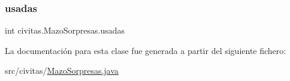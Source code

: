 \subsubsection{\texorpdfstring{usadas}{usadas}}
{\footnotesize\ttfamily int civitas.\+Mazo\+Sorpresas.\+usadas\hspace{0.3cm}{\ttfamily [private]}}



La documentación para esta clase fue generada a partir del siguiente fichero\+:\begin{DoxyCompactItemize}
\item 
src/civitas/\hyperlink{MazoSorpresas_8java}{Mazo\+Sorpresas.\+java}\end{DoxyCompactItemize}
